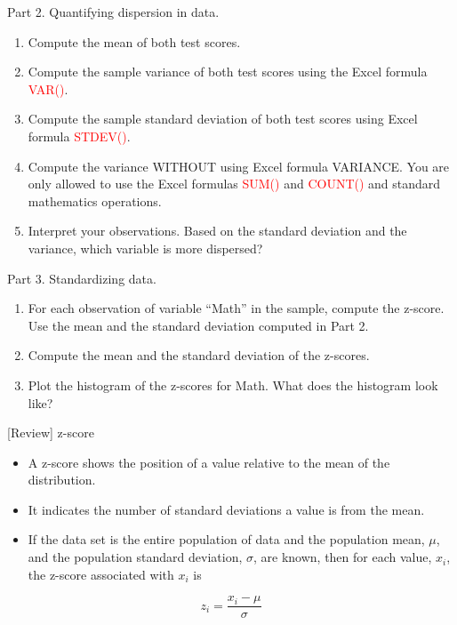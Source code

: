 \documentclass[
  10pt,
  ignorenonframetext,
]{beamer}
\providecommand{\tightlist}{%
  \setlength{\itemsep}{0pt}\setlength{\parskip}{0pt}}
\begin{document}
\begin{frame}{Part 2. Quantifying dispersion in data.}
\protect\hypertarget{part-2.-quantifying-dispersion-in-data.}{}
\begin{enumerate}
\tightlist
\item
  Compute the mean of both test scores.
\item
  Compute the sample variance of both test scores using the Excel
  formula \textcolor{red}{VAR()}.
\item
  Compute the sample standard deviation of both test scores using Excel
  formula \textcolor{red}{STDEV()}.
\item
  Compute the variance WITHOUT using Excel formula VARIANCE. You are
  only allowed to use the Excel formulas \textcolor{red}{SUM()} and
  \textcolor{red}{COUNT()} and standard mathematics operations.
\item
  Interpret your observations. Based on the standard deviation and the
  variance, which variable is more dispersed?
\end{enumerate}
\end{frame}

\begin{frame}{Part 3. Standardizing data.}
\protect\hypertarget{part-3.-standardizing-data.}{}
\begin{enumerate}
\tightlist
\item
  For each observation of variable ``Math'' in the sample, compute the
  z-score. Use the mean and the standard deviation computed in Part 2.
\item
  Compute the mean and the standard deviation of the z-scores.
\item
  Plot the histogram of the z-scores for Math. What does the histogram
  look like?
\end{enumerate}
\end{frame}

\begin{frame}{{[}Review{]} z-score}
\protect\hypertarget{review-z-score}{}
\begin{itemize}
\item
  A z-score shows the position of a value relative to the mean of the
  distribution.
\item
  It indicates the number of standard deviations a value is from the
  mean.
\item
  If the data set is the entire population of data and the population
  mean, \(\mu\), and the population standard deviation, \(\sigma\), are
  known, then for each value, \(x_i\), the z-score associated with
  \(x_i\) is
\end{itemize}

\[
z_i = \frac{x_i - \mu}{\sigma}
\]
\end{frame}
\end{document}
